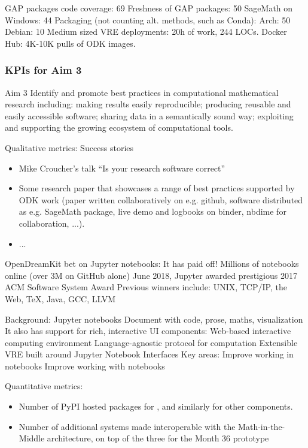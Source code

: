 \begin{Aim 1}
\begin{Aim 2}
GAP packages code coverage: 69%
Freshness of GAP packages: 50%
SageMath on Windows: 44%
Packaging (not counting alt. methods, such as Conda):
Arch: 50%
Debian: 10%
Medium sized VRE deployments: 20h of work, 244 LOCs.
Docker Hub: 4K-10K pulls of ODK images.

\subsubsection{KPIs for Aim 3}

\begin{recommendation}{Aim 3}
  Identify and promote best practices in computational mathematical
  research including: making results easily reproducible; producing
  reusable and easily accessible software; sharing data in a
  semantically sound way; exploiting and supporting the growing
  ecosystem of computational tools.
\end{recommendation}

Qualitative metrics: Success stories
\begin{itemize}
\item Mike Croucher's talk ``Is your research software correct''
\item Some research paper that showcases a range of best practices
  supported by ODK work (paper written collaboratively on e.g. github,
  software distributed as e.g. SageMath package, live demo and
  logbooks on binder, nbdime for collaboration, ...).
\item ...
\end{itemize}

OpenDreamKit bet on Jupyter notebooks: It has paid off!
Millions of notebooks online (over 3M on GitHub alone)
June 2018, Jupyter awarded prestigious 2017 ACM Software System Award
Previous winners include: UNIX, TCP/IP, the Web, TeX, Java, GCC, LLVM

Background: Jupyter notebooks
Document with code, prose, maths, visualization
It also has support for rich, interactive UI components:
Web-based interactive computing environment
Language-agnostic protocol for computation
Extensible VRE built around Jupyter
Notebook Interfaces
Key areas:
Improve working in notebooks
Improve working with notebooks

Quantitative metrics:
\begin{itemize}
\item Number of PyPI hosted packages for \Sage, and similarly for
  other components.
\item Number of additional systems made interoperable with the
  Math-in-the-Middle architecture, on top of the three for the Month
  36 prototype


\end{itemize}
\end{Aim 2}
\end{Aim 1}
